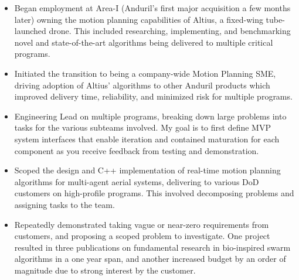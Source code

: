 \documentclass[10pt,a4paper,ragged2e,withhyper]{altacv}
\begin{document}
\begin{paracol}{2}

\begin{itemize}
\item Began employment at Area-I (Anduril's first major acquisition a few months later) owning the motion planning capabilities of Altius, a fixed-wing tube-launched drone. This included researching, implementing, and benchmarking novel and state-of-the-art algorithms being delivered to multiple critical programs.
\item Initiated the transition to being a company-wide Motion Planning SME, driving adoption of Altius' algorithms to other Anduril products which improved delivery time, reliability, and minimized risk for multiple programs.
\item Engineering Lead on multiple programs, breaking down large problems into tasks for the various subteams involved. My goal is to first define MVP system interfaces that enable iteration and contained maturation for each component as you receive feedback from testing and demonstration.
\end{itemize}

\divider

\begin{itemize}
\item Scoped the design and C++ implementation of real-time motion planning algorithms for multi-agent aerial systems, delivering to various DoD customers on high-profile programs. This involved decomposing problems and assigning tasks to the team.
\item Repeatedly demonstrated taking vague or near-zero requirements from customers, and proposing a scoped problem to investigate. One project resulted in three publications on fundamental research in bio-inspired swarm algorithms in a one year span, and another increased budget by an order of magnitude due to strong interest by the customer.
\end{itemize}

\divider


\end{paracol}
\end{document}
